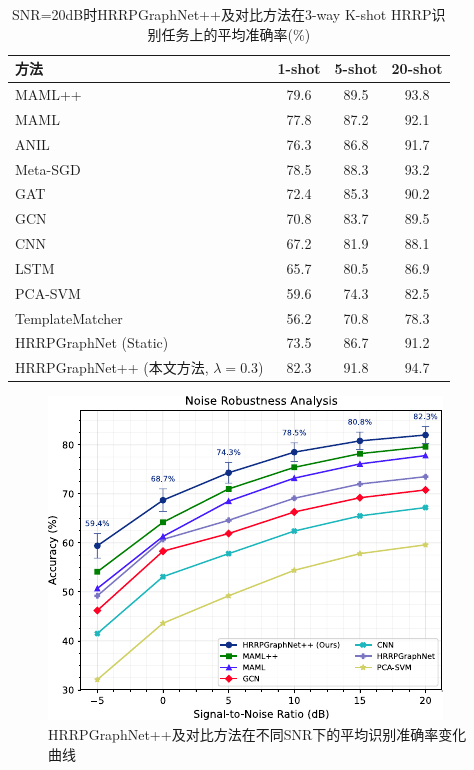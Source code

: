 \begin{table}[h!]
\centering
\caption{SNR=20dB时HRRPGraphNet++及对比方法在3-way K-shot HRRP识别任务上的平均准确率(\%)}
\label{tab:fewshot_comparison_chap3}
\begin{tabular}{lccc}
\toprule
方法                  & 1-shot & 5-shot & 20-shot \\
\midrule
MAML++ \cite{antoniou_how_2018} & 79.6   & 89.5   & 93.8    \\
MAML \cite{finn_model-agnostic_2017}       & 77.8   & 87.2   & 92.1    \\
ANIL \cite{raghu2020rapid} & 76.3   & 86.8   & 91.7    \\
Meta-SGD \cite{li_meta-sgd_2017} & 78.5   & 88.3   & 93.2    \\
GAT \cite{velickovic_graph_2018}  & 72.4   & 85.3   & 90.2    \\
GCN \cite{kipf_semi-supervised_2017}  & 70.8   & 83.7   & 89.5    \\
CNN \cite{Song2019}        & 67.2   & 81.9   & 88.1    \\
LSTM \cite{liu2021multi}       & 65.7   & 80.5   & 86.9    \\
PCA-SVM \cite{Liu2020}     & 59.6   & 74.3   & 82.5    \\
TemplateMatcher \cite{cui_template_2022} & 56.2   & 70.8   & 78.3    \\
\midrule
HRRPGraphNet \cite{Chen2024} (Static) & 73.5   & 86.7   & 91.2    \\
HRRPGraphNet++ (本文方法, $\lambda=0.3$) & 82.3   & 91.8   & 94.7    \\
\bottomrule
\end{tabular}
\end{table}

\begin{figure}[t]
    \centering
    \includegraphics[width=0.6\linewidth]{figures/noise_robust.pdf} %
    \caption{HRRPGraphNet++及对比方法在不同SNR下的平均识别准确率变化曲线}
    \label{fig:noise_robustness_chap3}
\end{figure}

